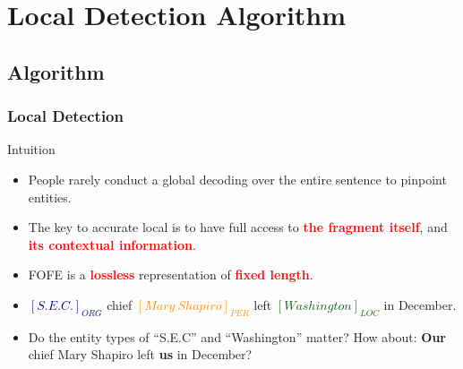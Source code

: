 \documentclass{beamer}
\begin{document}
\section{Local Detection Algorithm}

\subsection{Algorithm}

\begin{frame}
\frametitle{Local Detection}
\begin{block}{Intuition}
	\begin{itemize}
	\item People rarely conduct a global decoding over the entire sentence to pinpoint entities.
	\item The key to accurate local is to have full access to
		\textbf{\textcolor{red}{the fragment itself}}, and
		\textbf{\textcolor{red}{its contextual information}}.
	\item FOFE is a \textbf{\textcolor{red}{lossless}} representation of \textbf{\textcolor{red}{fixed length}}.
	\end{itemize}
\end{block}
\begin{example}
    \begin{itemize}
    \item \textbf{\textcolor{navy}{$[S.E.C.]_{ORG}$}} chief 
            \textbf{\textcolor{darkorange}{$[Mary\ Shapiro]_{PER}$}} left 
            \textbf{\textcolor{darkgreen}{$[Washington]_{LOC}$}} in December. \\
    \item Do the entity types of ``S.E.C'' and ``Washington'' matter? How about:
    \textbf{Our} chief Mary Shapiro left \textbf{us} in December?
    \end{itemize}
\end{example}
\end{frame}
\end{document}

